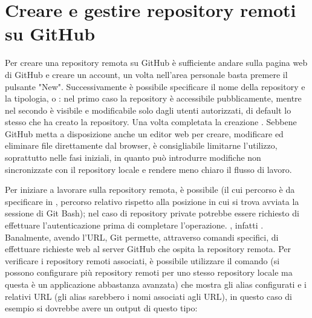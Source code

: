 \section{Creare e gestire repository remoti su GitHub}
\label{sec:creare-repository-remoti-su-gitHub}
Per creare una repository remota su GitHub è sufficiente andare sulla pagina web di GitHub e creare un account, un volta nell'area personale basta premere il pulsante "New". 
Successivamente è possibile specificare il nome della repository e la tipologia,  o : nel primo caso la repository è accessibile pubblicamente, mentre nel secondo è visibile e modificabile solo dagli utenti autorizzati, di default lo stesso che ha creato la repository. Una volta completata la creazione . Sebbene GitHub metta a disposizione anche un editor web per creare, modificare ed eliminare file direttamente dal browser, è consigliabile limitarne l'utilizzo, soprattutto nelle fasi iniziali, in quanto può introdurre modifiche non sincronizzate con il repository locale e rendere meno chiaro il flusso di lavoro.

Per iniziare a lavorare sulla repository remota, è possibile  (il cui percorso è da specificare in , percorso relativo rispetto alla posizione in cui si trova avviata la sessione di Git Bash); nel caso di repository private potrebbe essere richiesto di effettuare l'autenticazione prima di completare l'operazione. , infatti . Banalmente, avendo l'URL, Git permette, attraverso comandi specifici, di effettuare richieste web al server GitHub che ospita la repository remota. Per verificare i repository remoti associati, è possibile utilizzare il comando  (si possono configurare più repository remoti per uno stesso repository locale ma questa è un applicazione abbastanza avanzata) che mostra gli alias configurati e i relativi URL (gli alias sarebbero i nomi associati agli URL), in questo caso di esempio si dovrebbe avere un output di questo tipo:

